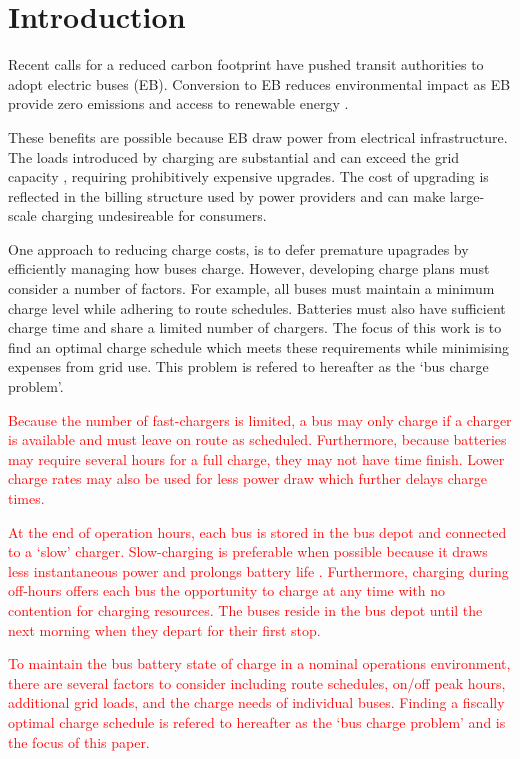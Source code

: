 \section{Introduction}
Recent calls for a reduced carbon footprint have pushed transit authorities to adopt electric buses (EB). Conversion to EB reduces environmental impact as EB provide zero emissions and access to renewable energy \cite{poornesh_comparative_2020}. 
\par These benefits are possible because EB draw power from electrical infrastructure. The loads introduced by charging are substantial and can exceed the grid capacity \cite{stahleder_impact_2019}\cite{deb_impact_2017}\cite{boonraksa_impact_2019}, requiring prohibitively expensive upgrades. The cost of upgrading is reflected in the billing structure used by power providers and can make large-scale charging undesireable for consumers. 
\par One approach to reducing charge costs, is to defer premature upagrades by efficiently managing how buses charge. However, developing charge plans must consider a number of factors. For example, all buses must maintain a minimum charge level while adhering to route schedules. Batteries must also have sufficient charge time and share a limited number of chargers. The focus of this work is to find an optimal charge schedule which meets these requirements while minimising expenses from grid use. This problem is refered to hereafter as the `bus charge problem'.
\par \textcolor{red}{Because the number of fast-chargers is limited, a bus may only charge if a charger is available and must leave on route as scheduled. Furthermore, because batteries may require several hours for a full charge, they may not have time finish. Lower charge rates may also be used for less power draw which further delays charge times.} 
\par \textcolor{red}{At the end of operation hours, each bus is stored in the bus depot and connected to a `slow' charger.  Slow-charging is preferable when possible because it draws less instantaneous power and prolongs battery life \cite{houbbadi_optimal_2019}.  Furthermore, charging during off-hours offers each bus the opportunity to charge at any time with no contention for charging resources. The buses reside in the bus depot until the next morning when they depart for their first stop.}
\par \textcolor{red}{To maintain the bus battery state of charge in a nominal operations environment, there are several factors to consider including route schedules, on/off peak hours, additional grid loads, and the charge needs of individual buses. Finding a fiscally optimal charge schedule is refered to hereafter as the `bus charge problem' and is the focus of this paper.}
